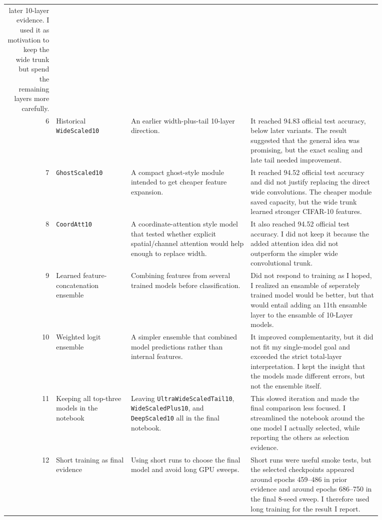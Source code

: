 \documentclass[11pt]{article}
\begin{document}
\begin{longtable}{r p{0.20\linewidth} p{0.32\linewidth} p{0.35\linewidth}}
later 10-layer evidence. I used it as motivation to keep the wide trunk but spend the
remaining layers more carefully. \\
6 & Historical \texttt{WideScaled10} &
An earlier width-plus-tail 10-layer direction. &
It reached 94.83 official test accuracy, below later variants. The result suggested that
the general idea was promising, but the exact scaling and late tail needed improvement. \\
7 & \texttt{GhostScaled10} &
A compact ghost-style module intended to get cheaper feature expansion. &
It reached 94.52 official test accuracy and did not justify replacing the direct wide
convolutions. The cheaper module saved capacity, but the wide trunk learned stronger
CIFAR-10 features. \\
8 & \texttt{CoordAtt10} &
A coordinate-attention style model that tested whether explicit spatial/channel
attention would help enough to replace width. &
It also reached 94.52 official test accuracy. I did not keep it because the added
attention idea did not outperform the simpler wide convolutional trunk. \\
9 & Learned feature-concatenation ensemble &
Combining features from several trained models before classification. &
Did not respond to training as I hoped, I realized an ensamble of seperately trained
model would be better, but that would entail adding an 11th ensamble layer to the
ensamble of 10-Layer models. \\
10 & Weighted logit ensemble &
A simpler ensemble that combined model predictions rather than internal features. &
It improved complementarity, but it did not fit my single-model goal and exceeded the
strict total-layer interpretation. I kept the insight that the models made different
errors, but not the ensemble itself. \\
11 & Keeping all top-three models in the notebook &
Leaving \texttt{UltraWideScaledTail10}, \texttt{WideScaledPlus10}, and
\texttt{DeepScaled10} all in the final notebook. &
This slowed iteration and made the final comparison less focused. I streamlined the
notebook around the one model I actually selected, while reporting the others as
selection evidence. \\
12 & Short training as final evidence &
Using short runs to choose the final model and avoid long GPU sweeps. &
Short runs were useful smoke tests, but the selected checkpoints appeared around epochs
459--486 in prior evidence and around epochs 686--750 in the final 8-seed sweep. I
therefore used long training for the result I report. \\
\bottomrule
\end{longtable}
\endgroup
\end{document}
